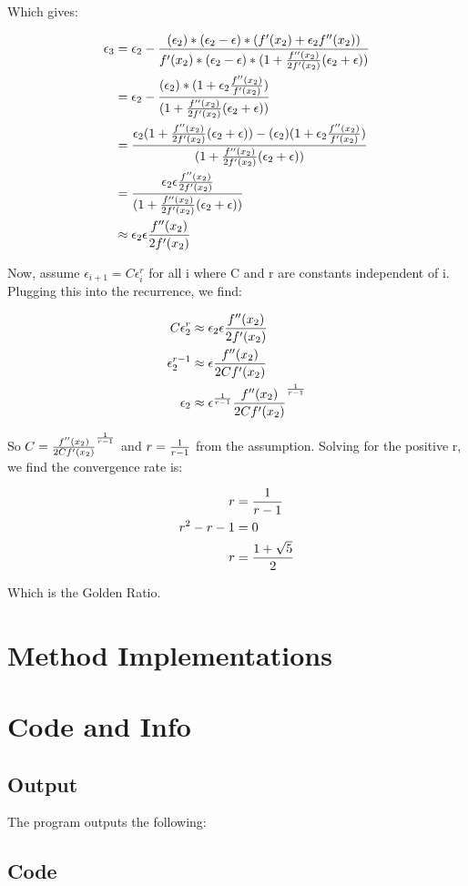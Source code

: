 \documentclass{article}
\begin{document}
Which gives: 

\begin{align*}
	\epsilon_3 &= \epsilon_2 - {(\epsilon_2) * (\epsilon_2  - \epsilon) * ( f'(x_2) + \epsilon_2 f''(x_2)) \over 
						f'(x_2) * (\epsilon_2 - \epsilon) * (1 + {f''(x_2) \over 2f'(x_2)} (\epsilon_2 + \epsilon))} \\
			&=  \epsilon_2 - {(\epsilon_2) * (1 + \epsilon_2 {f''(x_2) \over f'(x_2)}) \over 
						(1 + {f''(x_2) \over 2f'(x_2)} (\epsilon_2 + \epsilon))} \\
			&= {\epsilon_2 (1 + {f''(x_2) \over 2f'(x_2)} (\epsilon_2 + \epsilon)) - (\epsilon_2) (1 + \epsilon_2 {f''(x_2) \over f'(x_2)}) \over 
						(1 + {f''(x_2) \over 2f'(x_2)} (\epsilon_2 + \epsilon))} \\
			&= {\epsilon_2  \epsilon {f''(x_2) \over 2f'(x_2)}  \over 
						(1 + {f''(x_2) \over 2f'(x_2)} (\epsilon_2 + \epsilon))} \\
			&\approx \epsilon_2  \epsilon {f''(x_2) \over 2f'(x_2)}
\end{align*}

Now, assume $\epsilon_{i+1} = C \epsilon_i ^ r$ for all i where C and r are constants independent of i. Plugging this into the recurrence, we find:

\begin{align*}
	C \epsilon_2 ^ r &\approx \epsilon_2  \epsilon {f''(x_2) \over 2f'(x_2)} \\
	\epsilon_2	 ^ {r-1} &\approx \epsilon {f''(x_2) \over 2Cf'(x_2)} \\
	\epsilon_2	 &\approx \epsilon ^ {1 \over r-1} {f''(x_2) \over 2Cf'(x_2)}^ {1 \over r-1} \\
\end{align*}

So $C = {f''(x_2) \over 2Cf'(x_2)}^ {1 \over r-1}$ and $r = {1 \over r - 1}$ from the assumption. Solving for the positive r, we find the convergence rate is:

\begin{align*}
	r &= {1 \over r - 1} \\
	r^2 - r - 1&= 0 \\
	r &= {1 + \sqrt5 \over 2}
\end{align*}

Which is the Golden Ratio.

\section{Method Implementations}

\section{Code and Info}

\subsection{Output}
The program outputs the following:


\subsection{Code}
\end{document}
